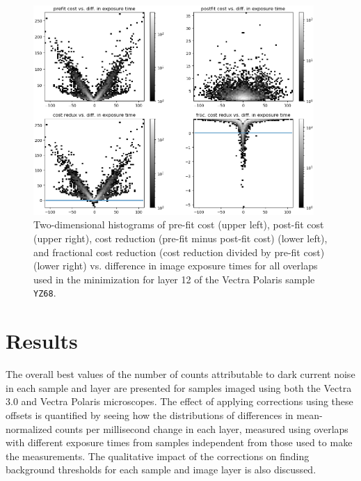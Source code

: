 \documentclass[letterpaper,11pt]{article}
\begin{document}
\begin{figure}[!ht]
\centering
\includegraphics[width=0.95\textwidth]{images/methods/cost_reduction_plots_2d_YZ68_layer_12}
\caption{\footnotesize Two-dimensional histograms of pre-fit cost (upper left), post-fit cost (upper right), cost reduction (pre-fit minus post-fit cost) (lower left), and fractional cost reduction (cost reduction divided by pre-fit cost) (lower right) vs. difference in image exposure times for all overlaps used in the minimization for layer 12 of the Vectra Polaris sample \texttt{YZ68}.}
\label{fig:cost_reduction_plots_YZ68_layer_12}
\end{figure}

\clearpage

\section{Results}
\label{sec:results}

The overall best values of the number of counts attributable to dark current noise in each sample and layer are presented for samples imaged using both the Vectra 3.0 and Vectra Polaris microscopes. The effect of applying corrections using these offsets is quantified by seeing how the distributions of differences in mean-normalized counts per millisecond change in each layer, measured using overlaps with different exposure times from samples independent from those used to make the measurements. The qualitative impact of the corrections on finding background thresholds for each sample and image layer is also discussed. 
\end{document}
